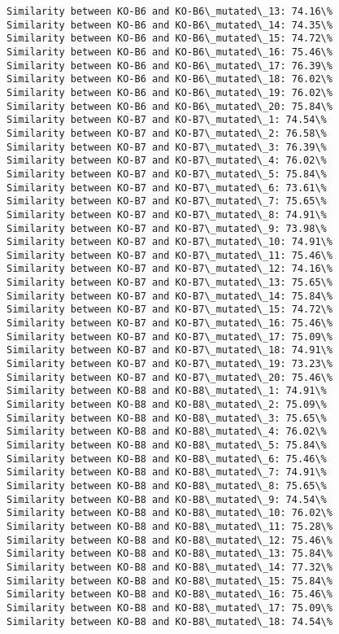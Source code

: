 \documentclass[11pt]{article}
\begin{document}
\begin{Verbatim}[commandchars=\\\{\}]
Similarity between KO-B6 and KO-B6\_mutated\_13: 74.16\%
Similarity between KO-B6 and KO-B6\_mutated\_14: 74.35\%
Similarity between KO-B6 and KO-B6\_mutated\_15: 74.72\%
Similarity between KO-B6 and KO-B6\_mutated\_16: 75.46\%
Similarity between KO-B6 and KO-B6\_mutated\_17: 76.39\%
Similarity between KO-B6 and KO-B6\_mutated\_18: 76.02\%
Similarity between KO-B6 and KO-B6\_mutated\_19: 76.02\%
Similarity between KO-B6 and KO-B6\_mutated\_20: 75.84\%
Similarity between KO-B7 and KO-B7\_mutated\_1: 74.54\%
Similarity between KO-B7 and KO-B7\_mutated\_2: 76.58\%
Similarity between KO-B7 and KO-B7\_mutated\_3: 76.39\%
Similarity between KO-B7 and KO-B7\_mutated\_4: 76.02\%
Similarity between KO-B7 and KO-B7\_mutated\_5: 75.84\%
Similarity between KO-B7 and KO-B7\_mutated\_6: 73.61\%
Similarity between KO-B7 and KO-B7\_mutated\_7: 75.65\%
Similarity between KO-B7 and KO-B7\_mutated\_8: 74.91\%
Similarity between KO-B7 and KO-B7\_mutated\_9: 73.98\%
Similarity between KO-B7 and KO-B7\_mutated\_10: 74.91\%
Similarity between KO-B7 and KO-B7\_mutated\_11: 75.46\%
Similarity between KO-B7 and KO-B7\_mutated\_12: 74.16\%
Similarity between KO-B7 and KO-B7\_mutated\_13: 75.65\%
Similarity between KO-B7 and KO-B7\_mutated\_14: 75.84\%
Similarity between KO-B7 and KO-B7\_mutated\_15: 74.72\%
Similarity between KO-B7 and KO-B7\_mutated\_16: 75.46\%
Similarity between KO-B7 and KO-B7\_mutated\_17: 75.09\%
Similarity between KO-B7 and KO-B7\_mutated\_18: 74.91\%
Similarity between KO-B7 and KO-B7\_mutated\_19: 73.23\%
Similarity between KO-B7 and KO-B7\_mutated\_20: 75.46\%
Similarity between KO-B8 and KO-B8\_mutated\_1: 74.91\%
Similarity between KO-B8 and KO-B8\_mutated\_2: 75.09\%
Similarity between KO-B8 and KO-B8\_mutated\_3: 75.65\%
Similarity between KO-B8 and KO-B8\_mutated\_4: 76.02\%
Similarity between KO-B8 and KO-B8\_mutated\_5: 75.84\%
Similarity between KO-B8 and KO-B8\_mutated\_6: 75.46\%
Similarity between KO-B8 and KO-B8\_mutated\_7: 74.91\%
Similarity between KO-B8 and KO-B8\_mutated\_8: 75.65\%
Similarity between KO-B8 and KO-B8\_mutated\_9: 74.54\%
Similarity between KO-B8 and KO-B8\_mutated\_10: 76.02\%
Similarity between KO-B8 and KO-B8\_mutated\_11: 75.28\%
Similarity between KO-B8 and KO-B8\_mutated\_12: 75.46\%
Similarity between KO-B8 and KO-B8\_mutated\_13: 75.84\%
Similarity between KO-B8 and KO-B8\_mutated\_14: 77.32\%
Similarity between KO-B8 and KO-B8\_mutated\_15: 75.84\%
Similarity between KO-B8 and KO-B8\_mutated\_16: 75.46\%
Similarity between KO-B8 and KO-B8\_mutated\_17: 75.09\%
Similarity between KO-B8 and KO-B8\_mutated\_18: 74.54\%

\end{Verbatim}
\end{document}
